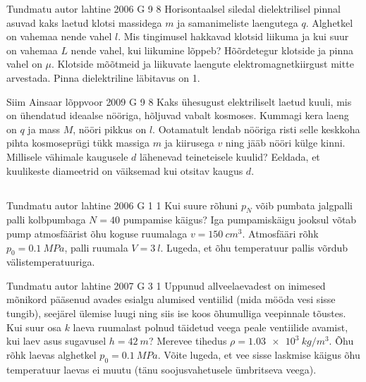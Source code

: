\documentclass[11pt]{article}
\begin{document}
{%
{Tundmatu autor} %
{lahtine} %
{2006} %
{G 9} %
{8} %
{
\ifStatement
Horisontaalsel siledal dielektrilisel pinnal asuvad kaks laetud klotsi massidega $m$ ja samanimeliste laengutega $q$. Alghetkel on vahemaa nende vahel $l$. Mis tingimusel hakkavad klotsid liikuma ja kui suur on vahemaa $L$ nende vahel, kui liikumine lõppeb? Hõõrdetegur klotside ja pinna vahel on $\mu$. Klotside mõõtmeid ja liikuvate laengute elektromagnetkiirgust mitte arvestada. Pinna dielektriline läbitavus on 1.
\fi
}

{Siim Ainsaar} %
{lõppvoor} %
{2009} %
{G 9} %
{8} %
{
\ifStatement
Kaks ühesugust elektriliselt laetud
kuuli, mis on ühendatud ideaalse nööriga, hõljuvad vabalt kosmoses. Kummagi
kera laeng on $q$ ja mass $M$, nööri pikkus on $l$.
Ootamatult lendab nööriga risti selle keskkoha pihta kosmoseprügi tükk massiga $m$ ja kiirusega
$v$ ning jääb nööri külge kinni. Millisele vähimale kaugusele $d$ lähenevad teineteisele kuulid?
Eeldada, et kuulikeste diameetrid on väiksemad kui otsitav kaugus $d$.
\fi
}
\newpage\subsection{\protect{}}

{Tundmatu autor} %
{lahtine} %
{2006} %
{G 1} %
{1} %
{
\ifStatement
Kui suure rõhuni $p_N$ võib pumbata jalgpalli palli kolbpumbaga $N = 40$ pumpamise käigus? Iga pumpamiskäigu jooksul võtab pump atmosfäärist õhu koguse ruumalaga $v = \SI{150}{cm^3}$. Atmosfääri rõhk $p_0 = \SI{0,1}{MPa}$, palli ruumala $V = \SI{3}{l}$. Lugeda, et õhu temperatuur pallis võrdub välistemperatuuriga.
\fi
}

{Tundmatu autor} %
{lahtine} %
{2007} %
{G 3} %
{1} %
{
\ifStatement
Uppunud allveelaevadest on inimesed mõnikord pääsenud avades esialgu alumised ventiilid (mida mööda vesi sisse tungib), seejärel ülemise luugi ning siis ise koos õhumulliga veepinnale tõustes. Kui suur osa $k$ laeva ruumalast polnud täidetud veega peale ventiilide avamist, kui laev asus sugavusel $h = \SI{42}{m}$? Merevee tihedus $\rho = \SI{1,03e3}{kg/m^3}$. Õhu rõhk laevas alghetkel $p_0 = \SI{0,1}{MPa}$. Võite lugeda, et vee sisse laskmise käigus õhu temperatuur laevas ei muutu (tänu soojusvahetusele ümbritseva veega).
\fi
}

}
\end{document}
